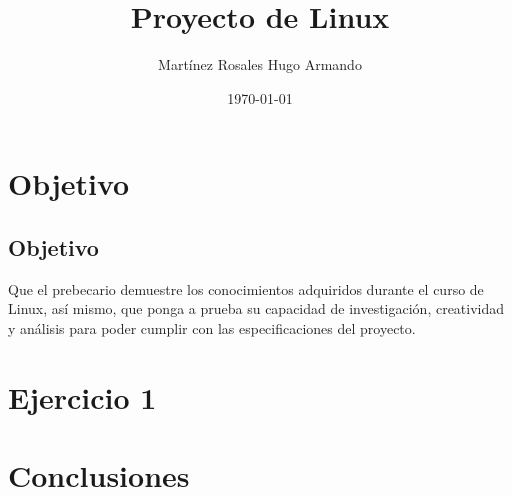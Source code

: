 \documentclass[12pt]{article}
\title{\vspace{-4cm}\textbf{Proyecto de Linux}}
\author{Martínez Rosales Hugo Armando}
\date{\today}
\begin{document}
	\maketitle
	
	\section*{Objetivo}
	\subsection*{Objetivo} Que el prebecario demuestre los conocimientos adquiridos durante el curso de Linux,  así mismo, que ponga a prueba su capacidad de investigación, creatividad y análisis para poder  cumplir con las especificaciones del proyecto. 
	
	\section*{Ejercicio 1}

	
	\section*{Conclusiones}

	
\end{document}
